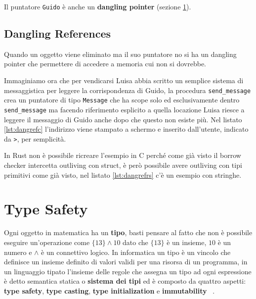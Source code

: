 \documentclass[Lau,binding=0.6cm]{sapthesis}
\newcommand{\textcode}[1]{\colorbox{backcolour}{\texttt{#1}}}
\begin{document}



Il puntatore \textcode{Guido} è anche un \textbf{dangling pointer} (sezione \ref{sec:dangling_reference}).

\section{Dangling References} \label{sec:dangling_reference}
Quando un oggetto viene eliminato ma il suo puntatore no si ha un dangling pointer che permettere di accedere a memoria cui non si dovrebbe.

Immaginiamo ora che per vendicarsi Luisa abbia scritto un semplice sistema di messaggistica per leggere la corrispondenza di Guido, la procedura \textcode{send\_message} crea un puntatore di tipo \textcode{Message} che ha scope solo ed esclusivamente dentro \textcode{send\_message} ma facendo riferimento esplicito a quella locazione Luisa riesce a leggere il messaggio di Guido anche dopo che questo non esiste più.
Nel listato \ref{lst:dangrefc} l'indirizzo viene stampato a schermo e inserito dall'utente, indicato da \textcode{>}, per semplicità.




In Rust non è possibile ricreare l'esempio in C perché come già visto il borrow checker intercetta outliving con struct, è però possibile avere outliving con tipi primitivi come già visto, nel listato \ref{lst:dangrefrs} c'è un esempio con stringhe.



\chapter{Type Safety} \label{chap:type_safety}
Ogni oggetto in matematica ha un \textbf{tipo}, basti pensare al fatto che non è possibile eseguire un'operazione come $ \{13\} \land 10 $ dato che $\{13\}$ è un insieme, $10$ è un numero e $\land$ è un connettivo logico. 
In informatica un tipo è un vincolo che definisce un insieme definito di valori validi per una risorsa di un programma, in un linguaggio tipato l'insieme delle regole che assegna un tipo ad ogni espressione è detto semantica statica o \textbf{sistema dei tipi} ed è composto da quattro aspetti: \textbf{type safety}, \textbf{type casting}, \textbf{type initialization} e \textbf{immutability} ~\cite{security_framework}.
\end{document}
